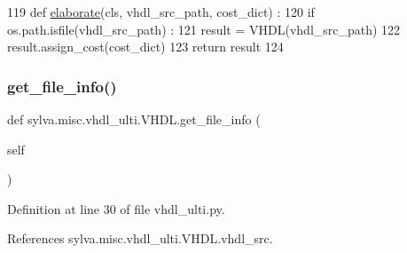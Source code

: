 \begin{DoxyCode}
119   \textcolor{keyword}{def }\hyperlink{namespacesylva_1_1frontend_1_1simulink2sdf_a65e70cbcdade6118914d5c16f96ae56c}{elaborate}(cls, vhdl\_src\_path, cost\_dict) :
120     \textcolor{keywordflow}{if} os.path.isfile(vhdl\_src\_path) :
121       result = VHDL(vhdl\_src\_path)
122       result.assign\_cost(cost\_dict)
123     \textcolor{keywordflow}{return} result
124 
\end{DoxyCode}
\mbox{\label{classsylva_1_1misc_1_1vhdl__ulti_1_1_v_h_d_l_ad90cd226a1be4574ec7fe86b84f9e959}} 
\subsubsection{\texorpdfstring{get\+\_\+file\+\_\+info()}{get\_file\_info()}}
{\footnotesize\ttfamily def sylva.\+misc.\+vhdl\+\_\+ulti.\+V\+H\+D\+L.\+get\+\_\+file\+\_\+info (\begin{DoxyParamCaption}\item[{}]{self }\end{DoxyParamCaption})}



Definition at line 30 of file vhdl\+\_\+ulti.\+py.



References sylva.\+misc.\+vhdl\+\_\+ulti.\+V\+H\+D\+L.\+vhdl\+\_\+src.


